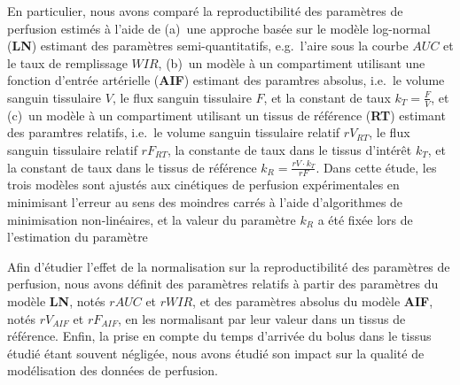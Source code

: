 \begin{otherlanguage}{francais}
En particulier, nous avons compar\'e la reproductibilit\'e des param\`etres de perfusion estim\'es \`a l'aide de (a)~une approche bas\'ee sur le mod\`ele log-normal (\textbf{LN}) estimant des param\`etres semi-quantitatifs, e.g.~l'aire sous la courbe $AUC$ et le taux de remplissage $WIR$, (b)~un mod\`ele \`a un compartiment utilisant une fonction d'entr\'ee art\'erielle (\textbf{AIF}) estimant des param\`tres absolus, i.e.~le volume sanguin tissulaire $V$, le flux sanguin tissulaire $F$, et la constant de taux $k_T = \frac{F}{V}$, et (c)~un mod\`ele \`a un compartiment utilisant un tissus de r\'ef\'erence (\textbf{RT}) estimant des param\`tres relatifs, i.e.~le volume sanguin tissulaire relatif $rV_{RT}$, le flux sanguin tissulaire relatif $rF_{RT}$, la constante de taux dans le tissus d'int\'er\^et $k_{T}$, et la constant de taux dans le tissus de r\'ef\'erence $k_R = \frac{rV \cdot k_T}{rF}$.
Dans cette \'etude, les trois mod\`eles sont ajust\'es aux cin\'etiques de perfusion exp\'erimentales en minimisant l'erreur au sens des moindres carr\'es \`a l'aide d'algorithmes de minimisation non-lin\'eaires, et la valeur du param\`etre $k_R$ a \'et\'e fix\'ee lors de l'estimation du param\`etre

Afin d'\'etudier l'effet de la normalisation sur la reproductibilit\'e des param\`etres de perfusion, nous avons d\'efinit des param\`etres relatifs \`a partir des param\`etres du mod\`ele \textbf{LN}, not\'es $rAUC$ et $rWIR$, et des param\`etres absolus du mod\`ele \textbf{AIF}, not\'es $rV_{AIF}$ et $rF_{AIF}$, en les normalisant par leur valeur dans un tissus de r\'ef\'erence.
Enfin, la prise en compte du temps d'arriv\'ee du bolus dans le tissus \'etudi\'e \'etant souvent n\'eglig\'ee, nous avons \'etudi\'e son impact sur la qualit\'e de mod\'elisation des donn\'ees de perfusion.


\end{otherlanguage}
